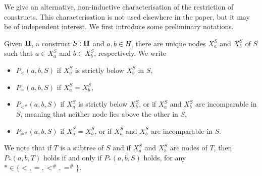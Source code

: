 \documentclass{article}
\theoremstyle{plain}
\theoremstyle{definition}
\newcommand{\set}[1]{\{#1\}}
\newcommand{\hyper}[1]{{\bf #1}}
\begin{document}
 
We give an alternative, non-inductive characterisation of the restriction of constructs. This characterisation is not used elsewhere in the paper, but it   may be of independent interest. We first introduce some preliminary notations.

\smallskip

Given $\hyper{H}$, a construct $S:\hyper{H}$ and $a,b\in H$,  there are unique nodes $X^S_a$ and $X^S_b$ of $S$ such that $a\in X^S_a$ and $b\in X^S_b$, respectively. We write
\begin{itemize}
\item $P_<(a,b,S)$ if  $X^S_a$ is strictly below  $X^S_b$ in $S$,
\item $P_=(a,b,S)$  if $X^S_a=X^S_b$,
\item $P_{<^\#}(a,b,S)$ if  $X^S_a$ is strictly below  $X^S_b$, or if $X^S_a$ and $X^S_b$ are incomparable in $S$, meaning that neither node lies above the other in $S$,
\item $P_{=^\#}(a,b,S)$ if $X^S_a=X^S_b$, or if $X^S_a$ and $X^S_b$ are incomparable in $S$.
\end{itemize}
We note that if $T$ is a subtree of $S$ and if $X^S_a$ and $X^S_b$ are nodes of $T$, then $P_{\ast}(a,b,T)$ holds if and only if 
$P_{\ast}(a,b,S)$ holds, for any $\ast\in\set{<,=,<^\#,=^\#}$.
\end{document}
